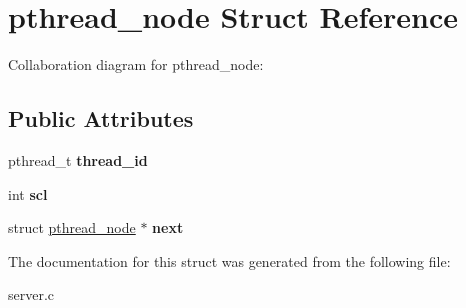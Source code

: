 \hypertarget{structpthread__node}{}\section{pthread\+\_\+node Struct Reference}
\label{structpthread__node}


Collaboration diagram for pthread\+\_\+node\+:
\subsection*{Public Attributes}
\begin{DoxyCompactItemize}
\item 
pthread\+\_\+t {\bfseries thread\+\_\+id}\hypertarget{structpthread__node_a9efc798685c02475dc772923228c9543}{}\label{structpthread__node_a9efc798685c02475dc772923228c9543}

\item 
int {\bfseries scl}\hypertarget{structpthread__node_a0de8cd5027affc1443cc5ebcaedc06fd}{}\label{structpthread__node_a0de8cd5027affc1443cc5ebcaedc06fd}

\item 
struct \hyperlink{structpthread__node}{pthread\+\_\+node} $\ast$ {\bfseries next}\hypertarget{structpthread__node_ac24e8366e84bbcd22f2e1acb2e474393}{}\label{structpthread__node_ac24e8366e84bbcd22f2e1acb2e474393}

\end{DoxyCompactItemize}


The documentation for this struct was generated from the following file\+:\begin{DoxyCompactItemize}
\item 
server.\+c\end{DoxyCompactItemize}
